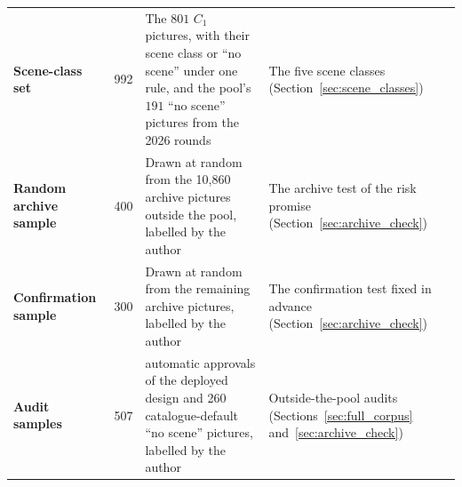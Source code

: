 \documentclass[12pt,a4paper]{report}
\begin{document}
\begin{table}[!htbp]
{\begin{tabular}{lc>{\raggedright\arraybackslash}p{6.5cm}>{\raggedright\arraybackslash}p{4.5cm}}
\textbf{Scene-class set} & 992 & The $801$ $C_1$ pictures, with their scene class or ``no scene'' under one rule, and the pool's $191$ ``no scene'' pictures from the 2026 rounds & The five scene classes (Section~\ref{sec:scene_classes}) \\
\textbf{Random archive sample} & 400 & Drawn at random from the 10,860 archive pictures outside the pool, labelled by the author & The archive test of the risk promise (Section~\ref{sec:archive_check}) \\
\textbf{Confirmation sample} & 300 & Drawn at random from the remaining archive pictures, labelled by the author & The confirmation test fixed in advance (Section~\ref{sec:archive_check}) \\
\textbf{Audit samples} & 507 & 247 automatic approvals of the deployed design and 260 catalogue-default ``no scene'' pictures, labelled by the author & Outside-the-pool audits (Sections~\ref{sec:full_corpus} and~\ref{sec:archive_check}) \\
\bottomrule
\end{tabular}%
}
\end{table}
\end{document}

